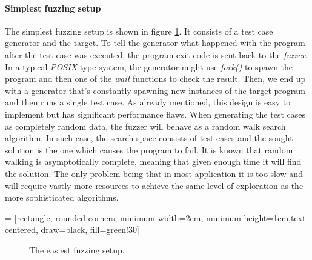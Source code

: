 \paragraph{Simplest fuzzing setup}
The simplest fuzzing setup is shown in figure \ref{fig:simp_fuzz}. It consists of a test case generator and the target. To tell the generator what happened with the program after the test case was executed, the program exit code is sent back to the \textit{fuzzer}. In a typical \textit{POSIX} type system, the generator might use \textit{fork()} to spawn the program and then one of the \textit{wait} functions to check the result. Then, we end up with a generator that's constantly spawning new instances of the target program and then runs a single test case. As already mentioned, this design is easy to implement but has significant performance flaws. When generating the test cases as completely random data, the fuzzer will behave as a random walk search algorithm. In such case, the search space consists of test cases and the sought solution is the one which causes the program to fail. It is known that random walking is asymptotically complete, meaning that given enough time it will find the solution. The only problem being that in most application it is too slow and will require vastly more resources to achieve the same level of exploration as the more sophisticated algorithms.

 = [rectangle, rounded corners, minimum width=2cm, minimum height=1cm,text centered, draw=black, fill=green!30]

\begin{figure}[h!]
    \centering


    \caption{The easiest fuzzing setup.}
    \label{fig:simp_fuzz}
\end{figure}

